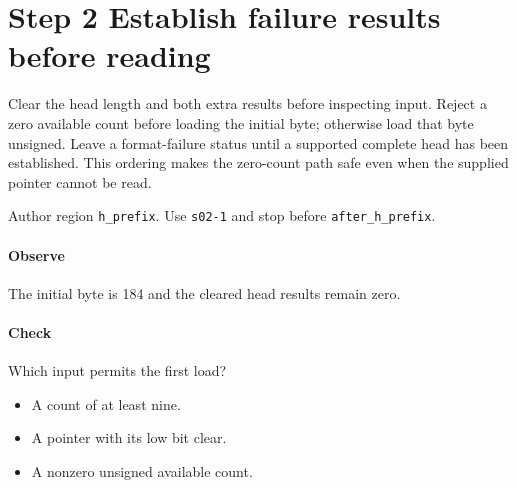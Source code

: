\section{Step 2 Establish failure results before reading}\label{cbor-s02}
Clear the head length and both extra results before inspecting input. Reject a zero available count before loading the initial byte; otherwise load that byte unsigned. Leave a format-failure status until a supported complete head has been established. This ordering makes the zero-count path safe even when the supplied pointer cannot be read.

Author region \texttt{h\_prefix}. Use \texttt{s02-1} and stop before \texttt{after\_h\_prefix}.

\paragraph{Observe} The initial byte is 184 and the cleared head results remain zero.

\paragraph{Check} Which input permits the first load?
\begin{itemize}
  \item[A.] A count of at least nine.
  \item[B.] A pointer with its low bit clear.
  \item[C.] A nonzero unsigned available count.
\end{itemize}

